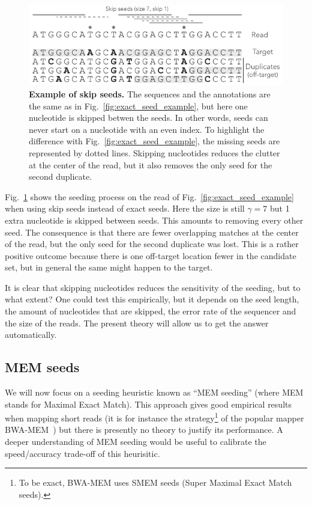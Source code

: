 \documentclass{article}
\begin{document}
\begin{figure}[h]
\centering
\includegraphics[scale=1]{skip_seed_example.pdf}
\caption{\textbf{Example of skip seeds.}
The sequences and the annotations are the same as in
Fig.~\ref{fig:exact_seed_example}, but here one nucleotide is skipped
betwen the seeds. In other words, seeds can never start on a nucleotide
with an even index. To highlight the difference with
Fig.~\ref{fig:exact_seed_example}, the missing seeds are represented by
dotted lines. Skipping nucleotides reduces the clutter at the center of
the read, but it also removes the only seed for the second duplicate.}
\label{fig:skip_seed_example}
\end{figure}

Fig.~\ref{fig:skip_seed_example} shows the seeding process on the read of
Fig.~\ref{fig:exact_seed_example} when using skip seeds instead of exact
seeds. Here the size is still $\gamma=7$ but 1 extra nucleotide is skipped
between seeds. This amounts to removing every other seed. The consequence
is that there are fewer overlapping matches at the center of the read, but
the only seed for the second duplicate was lost. This is a rather positive
outcome because there is one off-target location fewer in the candidate
set, but in general the same might happen to the target.

It is clear that skipping nucleotides reduces the sensitivity of the
seeding, but to what extent? One could test this empirically, but it
depends on the seed length, the amount of nucleotides that are skipped,
the error rate of the sequencer and the size of the reads. The present
theory will allow us to get the answer automatically.


\subsection{MEM seeds}

We will now focus on a seeding heuristic known as ``MEM seeding'' (where
MEM stands for Maximal Exact Match). This approach gives good empirical
results when mapping short reads (it is for instance the
strategy\footnote{To be exact, BWA-MEM uses SMEM seeds (Super Maximal
Exact Match seeds).} of the popular mapper BWA-MEM~\cite{li2013aligning})
but there is presently no theory to justify its performance. A deeper
understanding of MEM seeding would be useful to calibrate the
speed/accuracy trade-off of this heurisitic.
\end{document}
